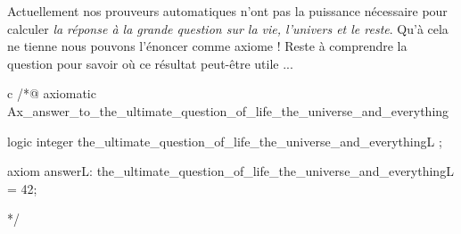 









Actuellement nos prouveurs automatiques n'ont pas la puissance nécessaire
pour calculer \textit{la réponse à la grande question sur la vie, l'univers et le
reste}. Qu'à cela ne tienne nous pouvons l'énoncer comme axiome ! Reste à
comprendre la question pour savoir où ce résultat peut-être utile ...

\begin{CodeBlock}{c}
/*@
  axiomatic Ax_answer_to_the_ultimate_question_of_life_the_universe_and_everything {
    logic integer the_ultimate_question_of_life_the_universe_and_everything{L} ;

    axiom answer{L}:
      the_ultimate_question_of_life_the_universe_and_everything{L} = 42;
  }
*/
\end{CodeBlock}




